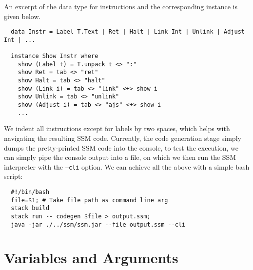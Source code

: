 An excerpt of the data type for instructions and the corresponding 
instance is given below.

\begin{verbatim}
  data Instr = Label T.Text | Ret | Halt | Link Int | Unlink | Adjust Int | ...

  instance Show Instr where
    show (Label t) = T.unpack t <> ":"
    show Ret = tab <> "ret"
    show Halt = tab <> "halt"
    show (Link i) = tab <> "link" <+> show i
    show Unlink = tab <> "unlink"
    show (Adjust i) = tab <> "ajs" <+> show i
    ...
\end{verbatim}

We indent all instructions except for labels by two spaces, which helps with
navigating the resulting SSM code.
Currently, the code generation stage simply dumps the pretty-printed SSM
code into the console, to test the execution, we can simply pipe the console
output into a file, on which we then run the SSM interpreter with the
\texttt{--cli} option. We can achieve all the above with a simple bash
script:
%
\begin{verbatim}
  #!/bin/bash
  file=$1; # Take file path as command line arg
  stack build
  stack run -- codegen $file > output.ssm;
  java -jar ./../ssm/ssm.jar --file output.ssm --cli
\end{verbatim}


\section{Variables and Arguments}

